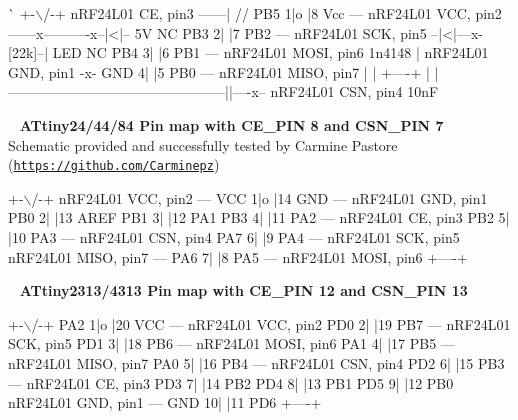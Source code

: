 \begin{DoxyCode}
                                                                                       ^^         
                             +-\(\backslash\)/-+           nRF24L01   CE, pin3 ------|              \textcolor{comment}{//         }
                       PB5  1|o   |8  Vcc --- nRF24L01  VCC, pin2 ------x----------x--|<|-- 5V    
               NC      PB3  2|    |7  PB2 --- nRF24L01  SCK, pin5 --|<|---x-[22k]--|  LED         
               NC      PB4  3|    |6  PB1 --- nRF24L01 MOSI, pin6  1n4148 |                       
nRF24L01 GND, pin1 -x- GND  4|    |5  PB0 --- nRF24L01 MISO, pin7         |                       
                    |        +----+                                       |                       
                    |-----------------------------------------------||----x-- nRF24L01 CSN, pin4  
                                                                  10nF                            
\end{DoxyCode}


~\newline
 {\bfseries A\+Ttiny24/44/84 Pin map with C\+E\+\_\+\+P\+IN 8 and C\+S\+N\+\_\+\+P\+IN 7} ~\newline
 Schematic provided and successfully tested by Carmine Pastore (\href{https://github.com/Carminepz}{\tt https\+://github.\+com/\+Carminepz}) ~\newline
 
\begin{DoxyCode}
                              +-\(\backslash\)/-+                                                              
nRF24L01  VCC, pin2 --- VCC  1|o   |14 GND --- nRF24L01  GND, pin1
                        PB0  2|    |13 AREF
                        PB1  3|    |12 PA1
                        PB3  4|    |11 PA2 --- nRF24L01   CE, pin3
                        PB2  5|    |10 PA3 --- nRF24L01  CSN, pin4
                        PA7  6|    |9  PA4 --- nRF24L01  SCK, pin5
nRF24L01 MISO, pin7 --- PA6  7|    |8  PA5 --- nRF24L01 MOSI, pin6
                              +----+
\end{DoxyCode}


~\newline
 {\bfseries A\+Ttiny2313/4313 Pin map with C\+E\+\_\+\+P\+IN 12 and C\+S\+N\+\_\+\+P\+IN 13} ~\newline
 
\begin{DoxyCode}
                              +-\(\backslash\)/-+                                                              
                        PA2  1|o   |20 VCC --- nRF24L01  VCC, pin2
                        PD0  2|    |19 PB7 --- nRF24L01  SCK, pin5
                        PD1  3|    |18 PB6 --- nRF24L01 MOSI, pin6
                        PA1  4|    |17 PB5 --- nRF24L01 MISO, pin7
                        PA0  5|    |16 PB4 --- nRF24L01  CSN, pin4
                        PD2  6|    |15 PB3 --- nRF24L01   CE, pin3
                        PD3  7|    |14 PB2
                        PD4  8|    |13 PB1
                        PD5  9|    |12 PB0
nRF24L01  GND, pin1 --- GND 10|    |11 PD6
                              +----+
\end{DoxyCode}


~\newline
~\newline
~\newline
 